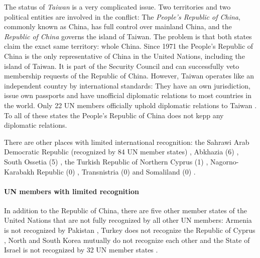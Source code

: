 The status of \emph{Taiwan} is a very complicated issue. Two territories and two political entities are involved in the conflict: The \emph{People's Republic of China}, commonly known as China, has full control over mainland China, and the \emph{Republic of China} governs the island of Taiwan. The problem is that both states claim the exact same territory: whole China. Since 1971 the People's Republic of China is the only representative of China in the United Nations, including the island of Taiwan. It is part of the Security Council and can successfully veto membership requests of the Republic of China. However, Taiwan operates like an independent country by international standards: They have an own jurisdiction, issue own passports and have unofficial diplomatic relations to most countries in the world. Only 22 UN members officially uphold diplomatic relations to Taiwan \cite{TaiwanRecognition}. To all of these states the People's Republic of China does not kepp any diplomatic relations.

There are other places with limited international recognition: the Sahrawi Arab Democratic Republic (recognized by 84 UN member states) \cite{WesternSaharaRecognition}, Abkhazia (6) \cite{AbkhaziaRecognition}, South Ossetia (5) \cite{SouthOssetiaRecognition}, the Turkish Republic of Northern Cyprus (1) \cite{NorthernCyprusRecognition}, Nagorno-Karabakh Republic (0) \cite{NagornoRecognition}, Transnistria (0) \cite{TransnistriaRecognition} and Somaliland (0) \cite{SomalilandRecognition}.


\paragraph{UN members with limited recognition} %
\label{par:un_members_with_limited_recognition}

In addition to the Republic of China, there are five other member states of the United Nations that are not fully recognized by all other UN members: Armenia is not recognized by Pakistan \cite{ArmeniaRecognition}, Turkey does not recognize the Republic of Cyprus \cite{CyprusRecognition}, North and South Korea mutually do not recognize each other \cite{KoreaRecognition} and the State of Israel is not recognized by 32 UN member states \cite{IsraelRecognition}.


